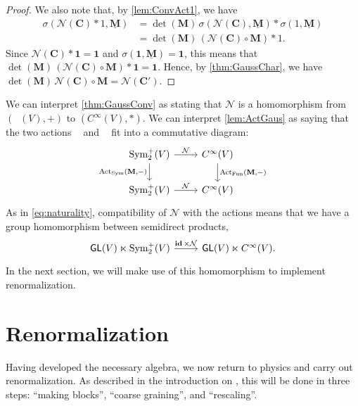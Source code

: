 \documentclass[12pt]{article}
\theoremstyle{definition}
\theoremstyle{plain}
\newcommand{\Symp}{\mathop{\mathrm{Sym}_2^+}}
\newcommand{\id}{\mathop{\mathbf{id}}\nolimits}
\newcommand{\ActSym}
{\mathop{\mathrm{Act}_{\mathrm{Sym}}}}
\newcommand{\ActFun}
{\mathop{\mathrm{Act}_{\mathrm{Fun}}}}
\begin{document}
\begin{proof}
    We also note that, by \autoref{lem:ConvAct1}, we have
    \begin{align}
        \sigma (\mathcal{N}(\mathbf{C}) * 1, \underline{\mathbf{M}}) 
        &= \det (\mathbf{M}) \, \sigma (\mathcal{N}(\mathbf{C}), \underline{\mathbf{M}}) * \sigma (1, \underline{\mathbf{M}}) \\
        &= \det (\mathbf{M}) \, (\mathcal{N}(\mathbf{C}) \circ \mathbf{M}) * 1.
    \end{align}
    Since \(\mathcal{N}(\mathbf{C}) * \boldsymbol{1} = \boldsymbol{1}\) and \(\sigma (\boldsymbol{1}, \underline{\mathbf{M}}) = \boldsymbol{1}\), this means that \(\det (\mathbf{M}) \, (\mathcal{N}(\mathbf{C}) \circ \mathbf{M}) * \boldsymbol{1} = \boldsymbol{1}\).
    Hence, by \autoref{thm:GaussChar}, we have \(\det (\mathbf{M}) \, \mathcal{N}(\mathbf{C}) \circ \mathbf{M} = \mathcal{N}(\mathbf{C}')\).
\end{proof}

We can interpret \autoref{thm:GaussConv} as stating that \(\mathcal{N}\) is a homomorphism from \((\Symp (V), +)\) to \((C^{\infty} (V), *)\). 
We can interpret \autoref{lem:ActGaus} as saying that the two actions $\ActSym$ and $\ActFun$
fit into a commutative diagram:
\begin{equation}\label{eq:ActCom}
\begin{tikzcd}
\Symp(V) \ar[r, "\mathcal N"] \ar[d, "\ActSym(\mathbf{M}{,}-)"'] & C^\infty(V) \ar[d, "\ActFun(\mathbf{M}{,} -)"] \\
\Symp(V) \ar[r, "\mathcal N"] & C^\infty(V)
\end{tikzcd}
\end{equation}
As in \autoref{eq:naturality}, compatibility of $\mathcal{N}$ with the actions means that we have a group homomorphism between semidirect products,
\begin{equation}\label{eq:ActCom}
    \begin{tikzcd}
        \mathsf{GL}(V) \ltimes \Symp(V) \ar[r, "\id \times \mathcal N"]
        &\mathsf{GL}(V) \ltimes C^\infty(V).
    \end{tikzcd}
\end{equation}
In the next section, we will make use of this homomorphism to implement renormalization.
 
\section{Renormalization} \label{sec:renorm}

Having developed the necessary algebra, we now return to physics and carry out renormalization.  As described in the introduction on , this will be done in three steps: ``making blocks'', ``coarse graining'', and ``rescaling''.
\end{document}
